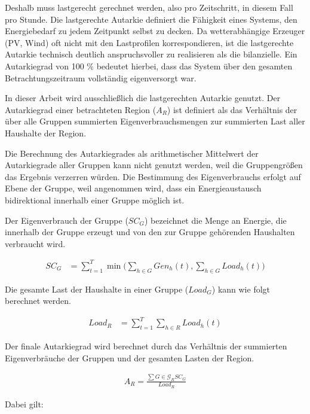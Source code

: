 Deshalb muss lastgerecht gerechnet werden, also pro Zeitschritt, in diesem Fall pro Stunde. Die lastgerechte Autarkie definiert die Fähigkeit eines Systems, den Energiebedarf zu jedem Zeitpunkt selbst zu decken. Da wetterabhängige Erzeuger (PV, Wind) oft nicht mit den Lastprofilen korrespondieren, ist die lastgerechte Autarkie technisch deutlich anspruchsvoller zu realisieren als die bilanzielle. Ein Autarkiegrad von 100 \% bedeutet hierbei, dass das System über den gesamten Betrachtungszeitraum vollständig eigenversorgt war.

In dieser Arbeit wird ausschließlich die lastgerechten Autarkie genutzt.
Der Autarkiegrad einer betrachteten Region ($A_R$) ist definiert als das Verhältnis der über alle Gruppen summierten Eigenverbrauchsmengen zur summierten Last aller Haushalte der Region.

Die Berechnung des Autarkiegrades als arithmetischer Mittelwert der Autarkiegrade aller Gruppen kann nicht genutzt werden, weil die Gruppengrößen das Ergebnis verzerren würden. Die Bestimmung des Eigenverbrauchs erfolgt auf Ebene der Gruppe, weil angenommen wird, dass ein Energieaustausch bidirektional innerhalb einer Gruppe möglich ist.

Der Eigenverbrauch der Gruppe ($SC_G$) bezeichnet die Menge an Energie, die innerhalb der Gruppe erzeugt und von den zur Gruppe gehörenden Haushalten verbraucht wird.

\begin{align}
    SC_{G} &= \sum_{t=1}^{T} \min\Bigg( \sum_{h \in G} Gen_h(t), \sum_{h \in G} Load_h(t) \Bigg)
\end{align}

Die gesamte Last der Haushalte in einer Gruppe ($Load_G$) kann wie folgt berechnet werden.

\begin{align}
    Load_{R} &= \sum_{t=1}^{T} \sum_{h \in R} Load_h(t)
\end{align}

Der finale Autarkiegrad wird berechnet durch das Verhältnis der summierten Eigenverbräuche der Gruppen und der gesamten Lasten der Region.

\begin{align}
\boxed{
    A_R = \frac{\sum{G \in \mathcal{G}_R} SC_G}{Load_R}
}
\end{align}

Dabei gilt:

\vspace{5mm}

